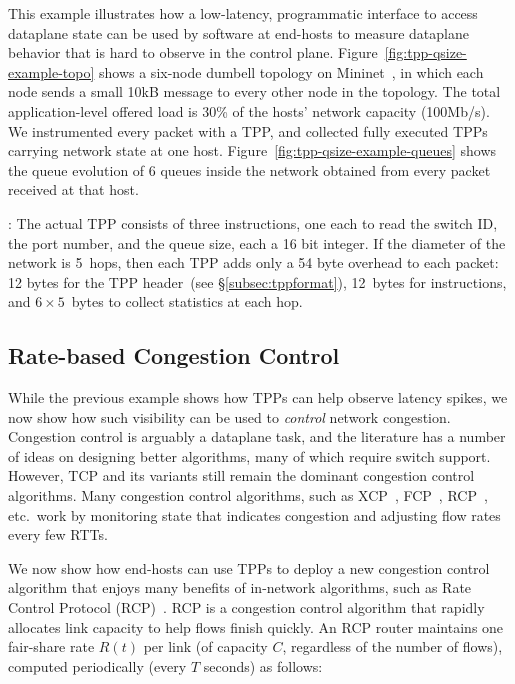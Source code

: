 This example illustrates how a low-latency,
programmatic interface to access dataplane state can be used by
software at end-hosts to measure dataplane behavior that is hard to
observe in the control plane.  Figure~\ref{fig:tpp-qsize-example-topo}
shows a six-node dumbell topology on
Mininet~\cite{handigol2012reproducible}, in which each node sends a
small 10kB message to every other node in the topology.  The total
application-level offered load is 30\% of the hosts' network capacity
(100Mb/s).  We instrumented every packet with a TPP, and collected
fully executed TPPs carrying network state at one host.
Figure~\ref{fig:tpp-qsize-example-queues} shows the queue evolution of
6 queues inside the network obtained from every packet received at
that host.

:  The actual TPP consists of three instructions,
one each to read the switch ID, the port number, and the queue size,
each a 16 bit integer.  If the diameter of the network is
5~hops, then each TPP adds only a 54 byte overhead to each
packet: 12 bytes for the TPP header~(see \S\ref{subsec:tppformat}),
12~bytes for instructions, and $6\times{}5$~bytes to collect statistics
at each hop.

\subsection{Rate-based Congestion Control}\label{subsec:rcp}
While the previous example shows how TPPs can help observe latency
spikes, we now show how such visibility can be used to {\em control}
network congestion.  Congestion control is arguably a dataplane task,
and the literature has a number of ideas on designing better
algorithms, many of which require switch support.  However, TCP and
its variants still remain the dominant congestion control algorithms.
Many congestion control algorithms, such as
XCP~\cite{katabi2002congestion}, FCP~\cite{han2013fcp},
RCP~\cite{dukkipati2006flow}, etc.\ work by monitoring state that
indicates congestion and adjusting flow rates every few RTTs.

We now show how end-hosts can use TPPs to deploy a new congestion control
algorithm that enjoys many benefits of in-network algorithms, such as Rate Control Protocol
(RCP\@)~\cite{dukkipati2006flow}.  RCP is a congestion control algorithm
that rapidly allocates link capacity to help flows finish quickly.  An
RCP router maintains one fair-share rate $R(t)$ per link (of capacity
$C$, regardless of the number of flows), computed periodically (every
$T$ seconds) as follows:


